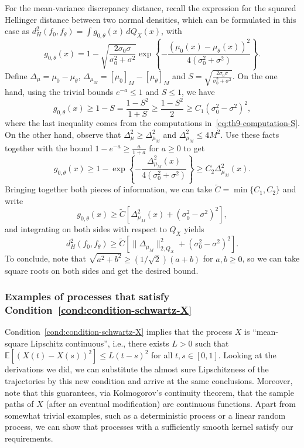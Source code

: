 For the mean-variance discrepancy distance, recall the expression for the squared Hellinger distance between two normal densities, which can be formulated in this case as \(d^2_H(f_0, f_\theta)= \int g_{0,\theta}(x)\, dQ_X(x)\), with
\[
  g_{0,\theta}(x) = 1 - \sqrt{\frac{2\sigma_0\sigma}{\sigma_0^2 + \sigma^2}}\exp\left\{ -\frac{(\mu_0(x) - \mu_{\theta}(x))^2}{4(\sigma_0^2 + \sigma^2)} \right\}.
\]
Define \(\Delta_\mu = \mu_0-\mu_\theta\), \(\Delta_{\mu_M} = [\mu_0]_M - [\mu_\theta]_M\) and \(S=\sqrt{\frac{2\sigma_0\sigma}{\sigma_0^2+\sigma^2}}\). On the one hand, using the trivial bounds \(e^{-a}\leq 1\) and \(S\leq 1\), we have
\[
  g_{0,\theta}(x) \geq 1 - S = \frac{1-S^2}{1+S} \geq \frac{1-S^2}{2} \geq C_1(\sigma_0^2 - \sigma^2)^2,
\]
where the last inequality comes from the computations in~\eqref{eq:th9-computation-S}. On the other hand, observe that \(\Delta^2_\mu \geq \Delta^2_{\mu_M}\) and \(\Delta^2_{\mu_M}\leq 4M^2\). Use these facts together with the bound \(1-e^{-a}\geq \frac{a}{1+a}\) for \(a\geq 0\) to get
\[
  g_{0,\theta}(x)  \geq  1 - \exp\left\{ -\frac{\Delta^2_{\mu_M}(x)}{4(\sigma_0^2+\sigma^2)} \right\} \geq C_2\Delta^2_{\mu_M}(x).
\]
Bringing together both pieces of information, we can take \(\tilde C = \min\{C_1, C_2\}\) and write
\[
  g_{0,\theta}(x) \geq \tilde C\left[\Delta^2_{\mu_M}(x) + (\sigma_0^2 - \sigma^2)^2\right],
\]
and integrating on both sides with respect to \(Q_X\) yields
\[
  d_H^2(f_0, f_\theta)\geq \tilde C\left[\|\Delta_{\mu_M}\|^2_{2,Q_X} + (\sigma_0^2 - \sigma^2)^2\right].
\]
To conclude, note that \(\sqrt{a^2+b^2}\geq (1/\sqrt{2})(a+b)\) for \(a,b\geq 0\), so we can take square roots on both sides and get the desired bound.


\subsubsection*{Examples of processes that satisfy Condition~\ref{cond:condition-schwartz-X}}

Condition~\ref{cond:condition-schwartz-X} implies that the process \(X\) is ``mean-square Lipschitz continuous'', i.e., there exists \(L>0\) such that \(\mathbb E[(X(t) - X(s))^2] \leq L (t-s)^2\) for all \(t, s \in [0,1]\). Looking at the derivations we did, we can substitute the almost sure Lipschitzness of the trajectories by this new condition and arrive at the same conclusions. Moreover, note that this guarantees, via Kolmogorov's continuity theorem, that the sample paths of \(X\) (after an eventual modification) are continuous functions. Apart from somewhat trivial examples, such as a deterministic process or a linear random process, we can show that processes with a sufficiently smooth kernel satisfy our requirements.

